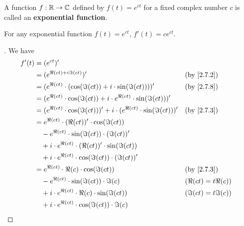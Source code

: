 \begin{defn}\label{2.7.9}
	A function \(f : \mathbb{R} \to \mathbb{C}\) defined by \(f(t) = e^{ct}\) for a fixed complex number \(c\) is called an \textbf{exponential function}.
\end{defn}

\begin{thm}\label{2.29}
	For any exponential function \(f(t) = e^{ct}\), \(f'(t) = c e^{ct}\).
\end{thm}

\begin{proof}[]
	We have
	\begin{align*}
		f'(t) & = (e^{ct})'                                                                                                 \\
		      & = (e^{\Re(ct) + i \Im(ct)})'                                                      &  & \by{2.7.2}           \\
		      & = (e^{\Re(ct)} \cdot (\cos(\Im(ct)) + i \cdot \sin(\Im(ct))))'                    &  & \by{2.7.8}           \\
		      & = (e^{\Re(ct)} \cdot \cos(\Im(ct)) + i \cdot e^{\Re(ct)} \cdot \sin(\Im(ct)))'                              \\
		      & = (e^{\Re(ct)} \cdot \cos(\Im(ct)))' + i \cdot (e^{\Re(ct)} \cdot \sin(\Im(ct)))' &  & \by{2.7.3}           \\
		      & = e^{\Re(ct)} \cdot (\Re(ct))' \cdot \cos(\Im(ct))                                                          \\
		      & \quad - e^{\Re(ct)} \cdot \sin(\Im(ct)) \cdot (\Im(ct))'                                                    \\
		      & \quad + i \cdot e^{\Re(ct)} \cdot (\Re(ct))' \cdot \sin(\Im(ct))                                            \\
		      & \quad + i \cdot e^{\Re(ct)} \cdot \cos(\Im(ct)) \cdot (\Im(ct))'                                            \\
		      & = e^{\Re(ct)} \cdot \Re(c) \cdot \cos(\Im(ct))                                    &  & \by{2.7.3}           \\
		      & \quad - e^{\Re(ct)} \cdot \sin(\Im(ct)) \cdot \Im(c)                              &  & (\Re(ct) = t \Re(c)) \\
		      & \quad + i \cdot e^{\Re(ct)} \cdot \Re(c) \cdot \sin(\Im(ct))                      &  & (\Im(ct) = t \Im(c)) \\
		      & \quad + i \cdot e^{\Re(ct)} \cdot \cos(\Im(ct)) \cdot \Im(c)                                                \\

\end{align*}
\end{proof}
